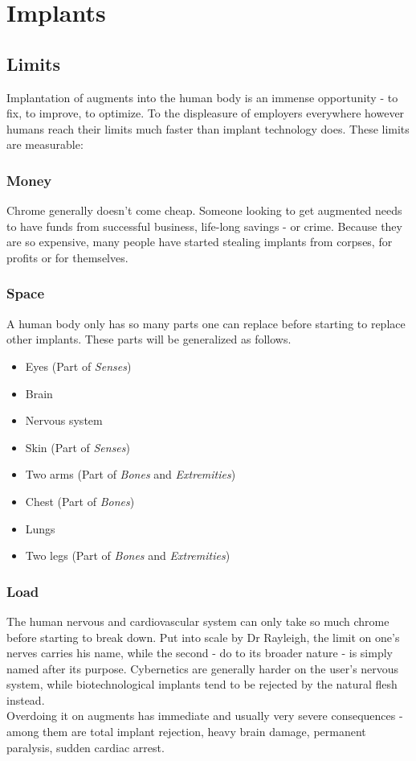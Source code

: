 	\section{Implants}
\subsection{Limits}
Implantation of augments into the human body is an immense opportunity - to fix, to improve, to optimize. To the displeasure of employers everywhere however humans reach their limits much faster than implant technology does. These limits are measurable:
	\subsubsection{Money}
	Chrome generally doesn't come cheap. Someone looking to get augmented needs to have funds from successful business, life-long savings - or crime. Because they are so expensive, many people have started stealing implants from corpses, for profits or for themselves.
	\subsubsection{Space}
	A human body only has so many parts one can replace before starting to replace other implants. These parts will be generalized as follows.
	\begin{multicols}{2}
	\begin{itemize}
		\setlength\itemsep{-10mm}
		\item Eyes (Part of \emph{Senses})
		\item Brain
		\item Nervous system
		\item Skin (Part of \emph{Senses})
		\item Two arms (Part of \emph{Bones} and \emph{Extremities})
		\item Chest (Part of \emph{Bones})
		\item Lungs %
		\item Two legs (Part of \emph{Bones} and \emph{Extremities})
	\end{itemize}
	\end{multicols}
	\subsubsection{Load}
	The human nervous and cardiovascular system can only take so much chrome before starting to break down.
	Put into scale by Dr Rayleigh, the limit on one's nerves carries his name, while the second - do to its broader nature - is simply named after its purpose.
	Cybernetics are generally harder on the user's nervous system, while biotechnological implants tend to be rejected by the natural flesh instead.\\
	Overdoing it on augments has immediate and usually very severe consequences - among them are total implant rejection, heavy brain damage, permanent paralysis, sudden cardiac arrest.

